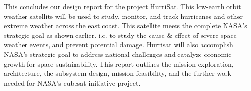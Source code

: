 This concludes our design report for the project HurriSat. This low-earth orbit weather satellite will be used to study, monitor, and track hurricanes and other extreme weather across the east coast. This satellite meets the complete NASA’s strategic goal as shown earlier. i.e. to study the cause & effect of severe space weather events, and prevent potential damage. Hurrisat will also accomplish NASA’s strategic goal to address national challenges and catalyze economic growth for space sustainability.  This report outlines the mission exploration, architecture, the subsystem design, mission feasibility, and the further work needed for NASA's cubesat initiative project. 